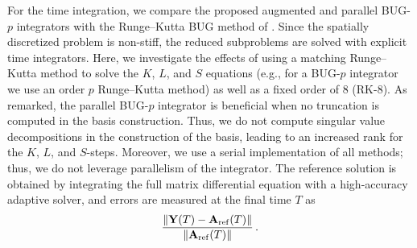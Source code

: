 \documentclass[preprint,runningheads]{svjour3}
\newcommand\bfA{{\mathbf A}}
\newcommand\bfY{{\mathbf Y}}
\begin{document}
For the time integration, we compare the proposed augmented
and parallel BUG-$p$ integrators with the Runge--Kutta BUG method
of \cite{nobile2025robust}. Since the spatially discretized problem is
non-stiff, the reduced subproblems are solved with explicit time integrators. Here, we investigate the effects of using a matching Runge--Kutta method to solve the $K$, $L$, and $S$ equations (e.g., for a BUG-$p$ integrator we use an order $p$ Runge--Kutta method) as well as a fixed order of $8$ (RK-8). As remarked, the parallel BUG-$p$ integrator is beneficial when no truncation is computed in the basis construction. Thus, we do not compute singular value decompositions in the construction of the basis, leading to an increased rank for the $K$, $L$, and $S$-steps. Moreover, we use a serial implementation of all methods; thus, we do not leverage parallelism of the integrator. The reference solution is obtained by integrating the full
matrix differential equation with a high-accuracy adaptive solver, and errors
are measured at the final time $T$ as
\begin{align}\label{eq:final_time_error}
    \frac{\|\bfY(T)-\bfA_{\rm ref}(T)\|}{\|\bfA_{\rm ref}(T)\|}\,.
\end{align}
\end{document}
